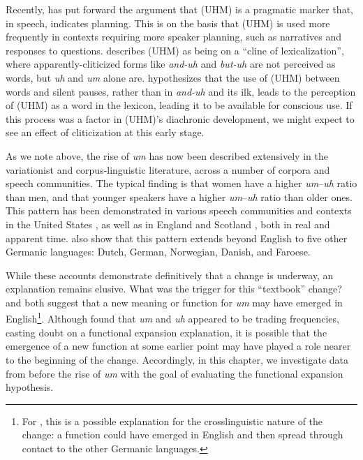 \documentclass[11pt]{article}
\begin{document}
Recently, \textcite{tottie2016} has put forward the argument that
(UHM) is a pragmatic marker that, in speech, indicates planning.
This is on the basis that (UHM) is used more frequently in contexts requiring
more speaker planning, such as narratives and responses to questions.
\textcite{tottie2017} describes (UHM) as being on a ``cline of lexicalization'',
where apparently-cliticized forms like \emph{and-uh} and \emph{but-uh} are not
perceived as words, but \emph{uh} and \emph{um} alone are.
\textcite[21--22]{tottie2017} hypothesizes that the use of (UHM) between words
and silent pauses, rather than in \emph{and-uh} and its ilk, leads to the
perception of (UHM) as a word in the lexicon, leading it to be available for
conscious use.
If this process was a factor in (UHM)'s diachronic development, we might expect
to see an effect of cliticization at this early stage.

As we note above, the rise of \emph{um} has now been described extensively in
the variationist and corpus-linguistic literature, across a number of corpora
and speech communities.
The typical finding is that women have a higher \emph{um}--\emph{uh} ratio than
men, and that younger speakers have a higher \emph{um}--\emph{uh} ratio than
older ones.
This pattern has been demonstrated in various speech communities and contexts in
the United States \parencite{acton2011, fruehwald2016, wielingetal2016,
lasernaetal2014}, as well as in England and Scotland \parencite{tottie2011,
wielingetal2016}, both in real and apparent time.
\textcite{wielingetal2016} also show that this pattern extends beyond English to
five other Germanic languages: Dutch, German, Norwegian, Danish, and Faroese.

While these accounts demonstrate definitively that a change is underway, an
explanation remains elusive.
What was the trigger for this ``textbook'' change?
\textcite{fruehwald2016} and \textcite{wielingetal2016} both suggest that a new
meaning or function for \emph{um} may have emerged in English\footnote{%
    For \textcite{wielingetal2016}, this is a possible explanation for the
    crosslinguistic nature of the change: a function could have emerged in
    English and then spread through contact to the other Germanic languages.
}.
Although \textcite{fruehwald2016} found that \emph{um} and \emph{uh} appeared to
be trading frequencies, casting doubt on a functional expansion explanation, it
is possible that the emergence of a new function at some earlier point may have
played a role nearer to the beginning of the change.
Accordingly, in this chapter, we investigate data from before the rise of \emph{um} with the goal of evaluating the functional expansion hypothesis.
\end{document}
